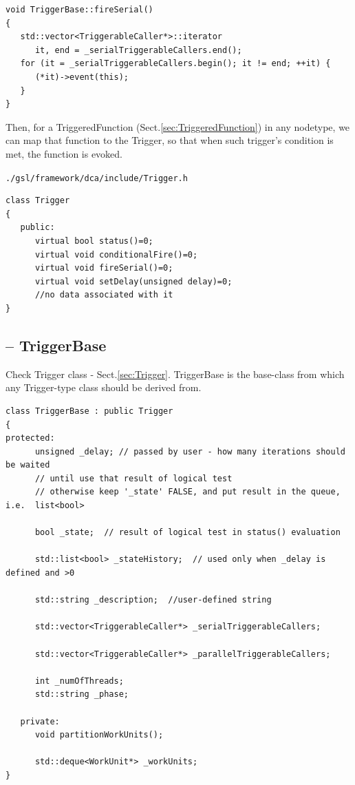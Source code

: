 {\small
\begin{lstlisting}
void TriggerBase::fireSerial() 
{
   std::vector<TriggerableCaller*>::iterator 
      it, end = _serialTriggerableCallers.end();
   for (it = _serialTriggerableCallers.begin(); it != end; ++it) {
      (*it)->event(this);
   }
}
\end{lstlisting}
}

Then, for a TriggeredFunction (Sect.\ref{sec:TriggeredFunction}) in any
nodetype, we can map that function to the Trigger, so that when such trigger's
condition is met, the function is evoked.

\verb!./gsl/framework/dca/include/Trigger.h!

\begin{verbatim}
class Trigger
{
   public:
      virtual bool status()=0;
      virtual void conditionalFire()=0;
      virtual void fireSerial()=0;
      virtual void setDelay(unsigned delay)=0;
      //no data associated with it
}
\end{verbatim}

\subsection{-- TriggerBase}
\label{sec:TriggerBase}

Check Trigger class - Sect.\ref{sec:Trigger}.
TriggerBase is the base-class from which any Trigger-type class should be
derived from.

{\small
\begin{verbatim}
class TriggerBase : public Trigger
{
protected:
      unsigned _delay; // passed by user - how many iterations should be waited
      // until use that result of logical test
      // otherwise keep '_state' FALSE, and put result in the queue, i.e.  list<bool>
      
      bool _state;  // result of logical test in status() evaluation
      
      std::list<bool> _stateHistory;  // used only when _delay is defined and >0
       
      std::string _description;  //user-defined string
      
      std::vector<TriggerableCaller*> _serialTriggerableCallers;
      
      std::vector<TriggerableCaller*> _parallelTriggerableCallers;
      
      int _numOfThreads;
      std::string _phase;

   private:
      void partitionWorkUnits();

      std::deque<WorkUnit*> _workUnits;
}
\end{verbatim}
}

